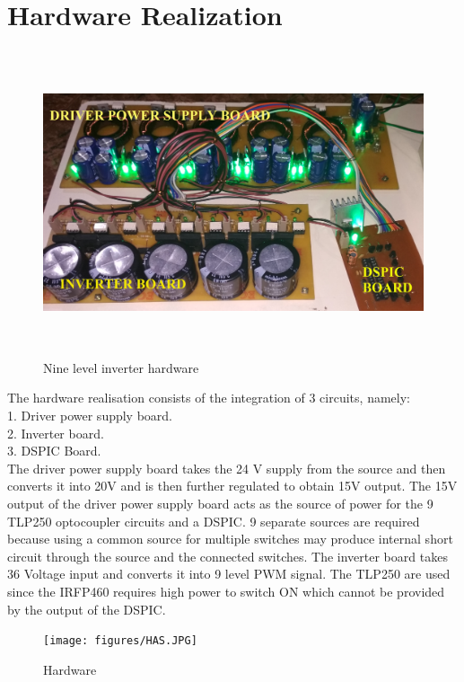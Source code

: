 \documentclass[12pt,a4paper]{report}
\begin{document}
\section{Hardware Realization}
\begin{figure}[H]
	\begin{center}
		\includegraphics[width=16cm,height=9cm]{figures/HARD.jpg}
	\end{center}
	\caption{Nine level inverter hardware}
\end{figure}

The hardware realisation consists of the integration of 3 circuits, namely:\\
1. Driver power supply board.\\
2. Inverter board.\\
3. DSPIC Board.\\

The driver power supply board takes the 24 V supply from the source and then converts it into 20V and is then further regulated to obtain 15V output. The 15V output of the driver power supply board acts as the source of power for the 9 TLP250 optocoupler circuits and a DSPIC. 9 separate sources are required because using a common source for multiple switches may produce internal short circuit through the source and the connected switches. The inverter board takes 36 Voltage input and converts it into 9 level PWM signal. The TLP250 are used since the IRFP460 requires high power to switch ON which cannot be provided by the output of the DSPIC.\\

\begin{figure}[H]
	\begin{center}
		\texttt{[image: figures/HAS.JPG]}
	\end{center}
	\caption{Hardware}
\end{figure}
\end{document}
